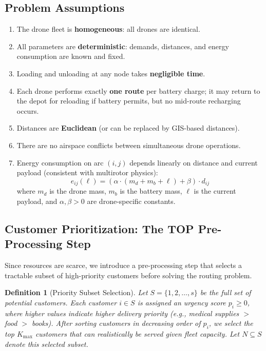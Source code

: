 \documentclass[12pt,a4paper]{article}
\newtheorem{definition}{Definition}
\begin{document}
\subsection{Problem Assumptions}

\begin{enumerate}
  \item The drone fleet is \textbf{homogeneous}: all drones are identical.
  \item All parameters are \textbf{deterministic}: demands, distances, and energy
  consumption are known and fixed.
  \item Loading and unloading at any node takes \textbf{negligible time}.
  \item Each drone performs exactly \textbf{one route} per battery charge; it may return
  to the depot for reloading if battery permits, but no mid-route recharging occurs.
  \item Distances are \textbf{Euclidean} (or can be replaced by GIS-based distances).
  \item There are no airspace conflicts between simultaneous drone operations.
  \item Energy consumption on arc $(i,j)$ depends linearly on distance and current
  payload (consistent with multirotor physics):
  \[
    e_{ij}(\ell) = (\alpha \cdot (m_d + m_b + \ell) + \beta) \cdot d_{ij}
  \]
  where $m_d$ is the drone mass, $m_b$ is the battery mass, $\ell$ is the current
  payload, and $\alpha, \beta > 0$ are drone-specific constants.
\end{enumerate}

\subsection{Customer Prioritization: The TOP Pre-Processing Step}

Since resources are scarce, we introduce a pre-processing step that selects a tractable
subset of high-priority customers before solving the routing problem.

\begin{definition}[Priority Subset Selection]
Let $S = \{1, 2, \ldots, s\}$ be the full set of potential customers. Each customer
$i \in S$ is assigned an urgency score $p_i \geq 0$, where higher values indicate
higher delivery priority (e.g., medical supplies $>$ food $>$ books). After sorting
customers in decreasing order of $p_i$, we select the top $K_{\max}$ customers that
can realistically be served given fleet capacity. Let $N \subseteq S$ denote this
selected subset.
\end{definition}
\end{document}
